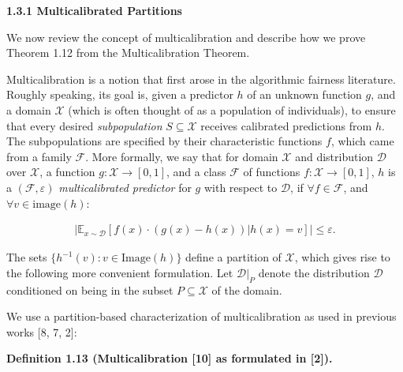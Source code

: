 \par\medskip\noindent\textbf{
1.3.1 Multicalibrated Partitions}\par




We now review the concept of multicalibration and describe how we prove Theorem 1.12 from the Multicalibration Theorem.\par




Multicalibration is a notion that first arose in the algorithmic fairness literature. Roughly speaking, its goal is, given a predictor $h$ of an unknown function $g$, and a domain $\mathcal{X}$ (which is often thought of as a population of individuals), to ensure that every desired \emph{subpopulation} $S\subseteq\mathcal{X}$ receives calibrated predictions from $h$. The subpopulations are specified by their characteristic functions $f$, which came from a family $\mathcal{F}$. More formally, we say that for domain $\mathcal{X}$ and distribution $\mathcal{D}$ over $\mathcal{X}$, a function $g:\mathcal{X}\rightarrow[0,1]$, and a class $\mathcal{F}$ of functions $f:\mathcal{X}\rightarrow[0,1]$, $h$ is a $(\mathcal{F},\varepsilon)$\emph{ multicalibrated predictor} for $g$ with respect to $\mathcal{D}$, if $\forall f\in\mathcal{F}$, and $\forall v\in\mathrm{image}(h)$:\par


\[\begin{gathered}
\left|\mathbb{E}_{x\sim\mathcal{D}}[f(x)\cdot(g(x)-h(x))|h(x)=v]\right|\leq\varepsilon.
\end{gathered}\]




The sets $\{h^{-1}(v):v\in\mathrm{Image}(h)\}$ define a partition of $\mathcal{X}$, which gives rise to the following more convenient formulation. Let $\mathcal{D}|_{P}$ denote the distribution $\mathcal{D}$ conditioned on being in the subset $P\subseteq\mathcal{X}$ of the domain.\par




We use a partition-based characterization of multicalibration as used in previous works [8, 7, 2]:\par





\par\medskip\noindent\textbf{
\textbf{Definition 1.13}\textbf{ }(Multicalibration [10] as formulated in [2])\textbf{.}
}\par



